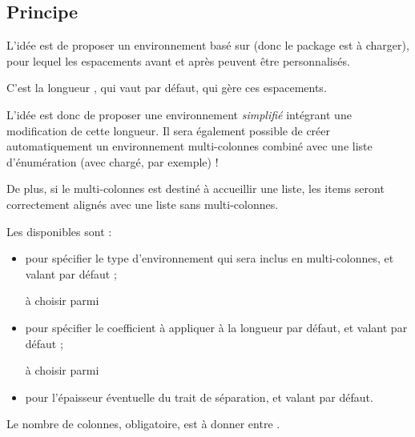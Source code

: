 \documentclass[french,11pt,a4paper]{article}
\begin{document}
\subsection{Principe}

L'idée est de proposer un environnement basé sur  (donc le package  est à charger), pour lequel les espacements avant et après peuvent être personnalisés.

C'est la longueur , qui vaut  par défaut, qui gère ces espacements.

\smallskip

L'idée est donc de proposer une environnement \textit{simplifié} intégrant une modification de cette longueur. Il sera également possible de créer automatiquement un environnement multi-colonnes combiné avec une liste d'énumération (avec  chargé, par exemple) !

De plus, si le multi-colonnes est destiné à accueillir une liste, les items seront correctement alignés avec une liste sans multi-colonnes.


Les  disponibles sont :

\begin{itemize}
	\item {} pour spécifier le type d'environnement qui sera inclus en multi-colonnes, et valant  par défaut ;
	
	\hfill{}à choisir parmi 
	\item {} pour spécifier le coefficient à appliquer à la longueur par défaut, et valant  par défaut ;
	
	\hfill{}à choisir parmi 
	\item {} pour l'épaisseur éventuelle du trait de séparation, et valant \MontreCode{0pt} par défaut.
\end{itemize}

Le nombre de colonnes, obligatoire, est à donner entre .
\end{document}
